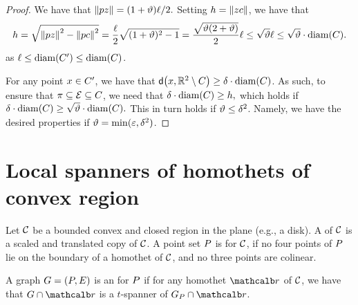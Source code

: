 \documentclass[12pt]{article}%
\begin{document}
\begin{proof}
    We have that
    \begin{math}
        \left\| p z \right\| = (1+\vartheta)\ell/2.
    \end{math}
    Setting $h = \left\| z c \right\|$, we have that
    \begin{equation*}
        h%
        =%
        \sqrt{\dY{\pa}{\pz}^2 - \dY{\pa}{\cen}^2 }
        =%
        \frac{\ell}{2} \sqrt{(1+\epsA)^2 - 1}
        =%
        \frac{\sqrt{\epsA (2+\epsA)}}{2} \ell%
        \leq
        \sqrt{\epsA} \ell
        \leq
        \sqrt{\epsA}\cdot \diameterX{\body}.
    \end{equation*}
    as $\ell \leq \diameterX{\body'} \leq \diameterX{\body}$.

    For any point $x \in C'$, we have that
    $\dsY{\px}{\Re^2 \setminus \body} \geq \delta \cdot
    \diamX{\body}$.  As such, to ensure that
    $\pi \subseteq \mathcal{E} \subseteq C$, we need that
    \begin{math}
        \delta \cdot \diamX{\body} \geq h,
    \end{math}
    which holds if
    \begin{math}
        \delta \cdot \diamX{\body} \geq \sqrt{\epsA} \cdot
        \diameterX{\body}.
    \end{math}
    This in turn holds if $\vartheta \leq \delta^2$. Namely, we have the
    desired properties if $\vartheta = \min( \varepsilon, \delta^2)$.
\end{proof}





\section{Local spanners of homothets of convex region}

Let $\mathcal{C}$ be a bounded convex and closed region in the plane (e.g., a
disk).  A  of $\mathcal{C}$ is a scaled and translated copy of
$\mathcal{C}$.  A point set $P$ is  for $\mathcal{C}$, if no
four points of $P$ lie on the boundary of a homothet of $\mathcal{C}$, and
no three points are colinear.


A graph $G=(P, E)$ is an 
for $P$ if for any homothet $\region$ of $\mathcal{C}$, we have that
$\restrictY{\G}{\region}$ is a $t$-spanner of $\G_\PS \cap \region$.
\end{document}
